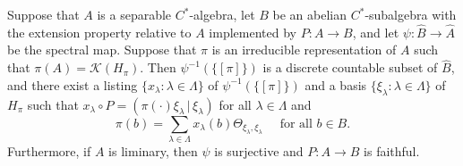 \documentclass[12pt,a4paper]{amsart}
\newcommand{\Kk}{\mathcal{K}}
\begin{document}
\begin{lemma}\label{lem:D-points}
Suppose that $A$ is a separable $C^*$-algebra, let $B$ be an
abelian $C^*$-subalgebra with the extension property relative
to $A$ implemented by $P:A\to B$, and let $\psi : \widehat{B}
\to \widehat{A}$ be the spectral map. Suppose that $\pi$ is an
irreducible representation of $A$ such that
$\pi(A)=\Kk(H_\pi)$. Then $\psi^{-1}(\{[\pi]\})$ is a discrete
countable subset of $\widehat{B}$, and there exist a listing
$\{x_\lambda : \lambda \in \Lambda\}$ of $\psi^{-1}(\{[\pi]\})$
and a basis $\{\xi_\lambda : \lambda \in \Lambda\}$ of $H_\pi$
such that $x_\lambda\circ P =
(\pi(\cdot)\xi_\lambda\,|\,\xi_\lambda)$ for all $\lambda \in
\Lambda$ and
\begin{equation}\label{eq:basis decomp}
\pi(b) = \sum_{\lambda \in \Lambda} x_\lambda(b) \Theta_{\xi_\lambda,\xi_\lambda}
     \quad\text{ for all $b \in B$.}
\end{equation}
Furthermore, if $A$ is liminary, then $\psi$ is surjective and
$P: A \to B$ is faithful.
\end{lemma}
\end{document}
